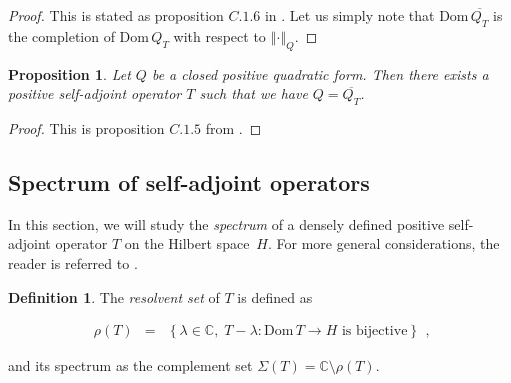 \documentclass{jams-l}
\newtheorem{proposition}[theorem]{Proposition}
\theoremstyle{definition}
\newtheorem{definition}[theorem]{Definition}
\theoremstyle{remark}
\numberwithin{equation}{section}
\begin{document}
        \begin{proof}
        
            This is stated as proposition $C.1.6$ in \cite[Appendix C]{MR2339952}. Let us simply note that $\mathrm{Dom} \, \overline{Q_T}$ is the completion of $\mathrm{Dom} \, Q_T$ with respect to $\left \Vert \cdot \right \Vert_Q$.
        
        \end{proof}
        
        \begin{proposition}
        
            Let $Q$ be a closed positive quadratic form. Then there exists a positive self-adjoint operator $T$ such that we have $Q = \overline{Q_T}$.
        
        \end{proposition}
        
        \begin{proof}
        
            This is proposition $C.1.5$ from \cite[Appendix C]{MR2339952}.
        
        \end{proof}
    
    
    \subsection{Spectrum of self-adjoint operators}
    
        In this section, we will study the \textit{spectrum} of a densely defined positive self-adjoint operator $T$ on the Hilbert space~$H$. For more general considerations, the reader is referred to \cite{MR1335452}.
        
        \begin{definition}
        
            The \textit{resolvent set} of $T$ is defined as
            
            \[ \begin{array}{lll}
                    \rho \left( T \right) & = & \left \{ \lambda \in \mathbb{C}, \; T - \lambda : \mathrm{Dom} \, T \longrightarrow H \text{ is bijective} \right \}
                \end{array} , \]
            
            \noindent and its spectrum as the complement set $\Sigma \left( T \right) = \mathbb{C} \setminus \rho \left( T \right)$.
        
        \end{definition}
        
\end{document}

